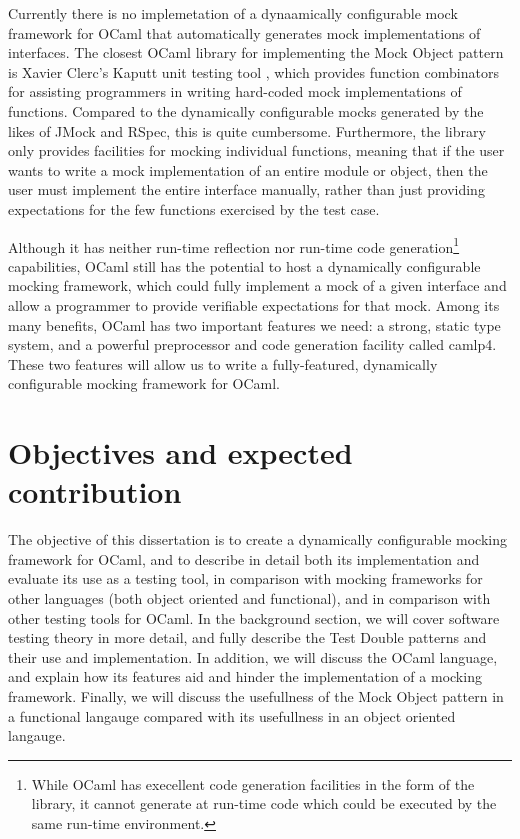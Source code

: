 Currently there is no implemetation of a dynaamically configurable
mock framework for OCaml that automatically generates mock
implementations of interfaces. The closest OCaml library for
implementing the Mock Object pattern is Xavier Clerc's Kaputt unit
testing tool \cite{www:kaputt}, which provides function combinators
for assisting programmers in writing hard-coded mock implementations
of functions. Compared to the dynamically configurable mocks generated
by the likes of JMock and RSpec, this is quite
cumbersome. Furthermore, the library only provides facilities for
mocking individual functions, meaning that if the user wants to write
a mock implementation of an entire module or object, then the user
must implement the entire interface manually, rather than just
providing expectations for the few functions exercised by the test
case.

Although it has neither run-time reflection nor run-time code
generation\footnote{While OCaml has execellent code generation
  facilities in the form of the  library, it
  cannot generate at run-time code which could be executed by the same
  run-time environment.} capabilities, OCaml still has the potential
to host a dynamically configurable mocking framework, which could
fully implement a mock of a given interface and allow a programmer to
provide verifiable expectations for that mock. Among its many
benefits, OCaml has two important features we need: a strong, static
type system, and a powerful preprocessor and code generation facility
called camlp4.\cite{www:camlp4} These two features will allow us to
write a fully-featured, dynamically configurable mocking framework for
OCaml.

\section{Objectives and expected contribution}

The objective of this dissertation is to create a dynamically
configurable mocking framework for OCaml, and to describe in detail
both its implementation and evaluate its use as a testing tool, in
comparison with mocking frameworks for other languages (both object
oriented and functional), and in comparison with other testing tools
for OCaml. In the background section, we will cover software testing
theory in more detail, and fully describe the Test Double patterns and
their use and implementation. In addition, we will discuss the OCaml
language, and explain how its features aid and hinder the
implementation of a mocking framework. Finally, we will discuss the
usefullness of the Mock Object pattern in a functional langauge
compared with its usefullness in an object oriented langauge.
